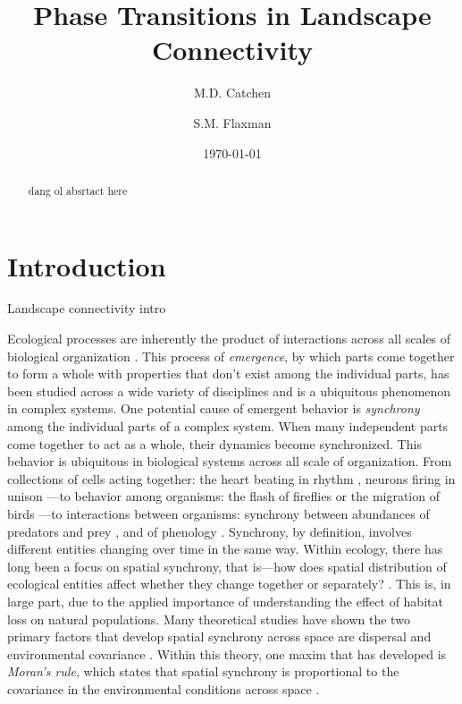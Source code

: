 \documentclass[]{article}
\title{Phase Transitions in Landscape Connectivity}
\author[1,2]{M.D. Catchen}
\author[1]{S.M. Flaxman}
\affil[1]{\small{Department of Ecology and Evolutionary Biology, University of Colorado at Boulder}}
\affil[2]{\small{Department of Biology, McGill University}}
\date{\today}
\begin{document}
\maketitle
\begin{abstract}

dang ol absrtact here

\end{abstract}
\clearpage

\section{Introduction}

Landscape connectivity intro

Ecological processes are inherently the product of interactions across all scales of biological organization \cite{levin_problem_1992}. This process of \textit{emergence}, by which parts come together to form a whole with properties that don't exist among the individual parts, has been studied across a wide variety of disciplines \cite{manrubia_emergence_2004} and is a ubiquitous phenomenon in complex systems. One potential cause of emergent behavior is \textit{synchrony} among the individual parts of a complex system. When many independent parts come together to act as a whole, their dynamics become synchronized.
This behavior is ubiquitous in biological systems across all scale of organization.
From collections of cells acting together: the heart beating in rhythm \cite{womelsdorf_modulation_2007}, neurons firing in unison \cite{strogatz_sync_2003}---to behavior among organisms: the flash of fireflies \cite{otte_theories_1980} or the migration of birds \cite{spottiswoode_extrapair_2004}---to interactions between organisms: synchrony between abundances of predators and prey \cite{lv}, and of phenology \cite{van_asch_phenology_2007,burkle_future_2011}.
Synchrony, by definition, involves different entities changing over time in the same way. Within ecology, there has long been a focus on spatial synchrony, that is—how does spatial distribution of ecological entities affect whether they change together or separately? \cite{jarillo_spatial_2020, kendall_dispersal_2000, hanski_spatial_1993}.
This is, in large part, due to the applied importance of understanding the effect of habitat loss on natural populations. Many theoretical studies have shown the two primary factors that develop spatial synchrony across space are dispersal and environmental covariance \cite{ripa_analysing_2000, abbott_does_2007}.
Within this theory, one maxim that has developed is \textit{Moran's rule}, which states that spatial synchrony is proportional to the covariance in the environmental conditions across space \cite{ranta_synchrony_1995, bjornstad_spatial_1999}.
\end{document}
